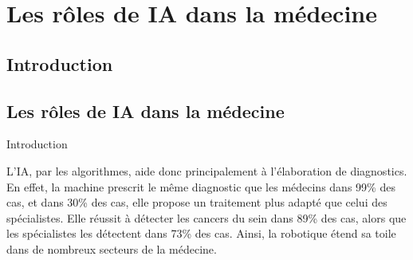 \section{Les rôles de \textbf{IA} dans la médecine}
\subsection{Introduction}
\subsection{Les rôles de \textbf{IA} dans la médecine}

\begin{frame}{Introduction}
    \begin{enumerate}[<+-|alert@+>]
        \myitem L'IA, par les algorithmes, aide donc principalement à l'élaboration de
                diagnostics.
        \myitem En effet, la machine prescrit le même diagnostic que les
                médecins dans 99\% des cas, et dans 30\% des cas, elle propose un
                traitement plus adapté que celui des spécialistes. Elle réussit à
                détecter les cancers du sein dans 89\% des cas, alors que les
                spécialistes les détectent dans 73\% des cas.
        \myitem Ainsi, la robotique étend sa toile dans de nombreux secteurs de
            la médecine.\mybox
    \end{enumerate}
\end{frame}

